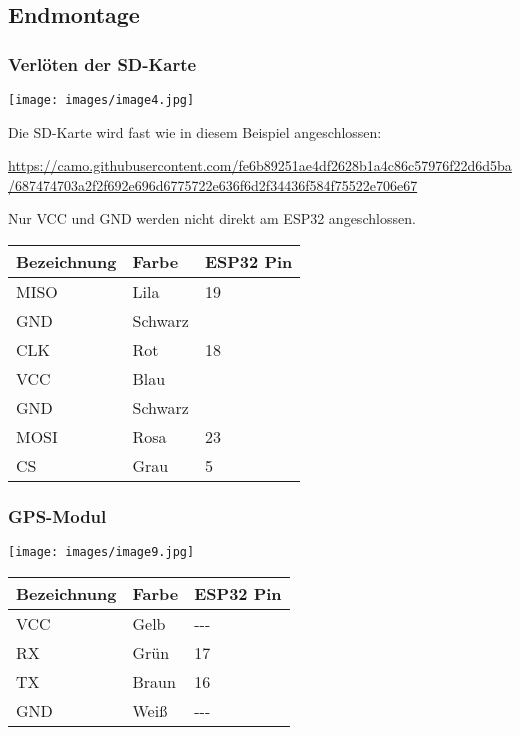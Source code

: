 \documentclass{scrartcl}
\begin{document}
\subsection*{Endmontage}

\subsubsection{Verlöten der SD-Karte}


\begin{center}
	\texttt{[image: images/image4.jpg]}
\end{center}

{Die SD-Karte wird fast wie in diesem Beispiel angeschlossen:}

{\href{https://www.google.com/url?q=https://camo.githubusercontent.com/fe6b89251ae4df2628b1a4c86c57976f22d6d5ba/687474703a2f2f692e696d6775722e636f6d2f34436f584f75522e706e67\&sa=D\&ust=1588976963798000}{https://camo.githubusercontent.com/fe6b89251ae4df2628b1a4c86c57976f22d6d5ba/687474703a2f2f692e696d6775722e636f6d2f34436f584f75522e706e67}}


Nur VCC und GND werden nicht direkt am ESP32 angeschlossen.


\begin{center}
	\begin{tabular}{@{}lll@{}}
		\toprule
		{Bezeichnung} & {Farbe} & {ESP32 Pin}\\
		\midrule
		{MISO} & {Lila} & {19}\\
		{GND} & {Schwarz} & {}\\
		{CLK} & {Rot} & {18}\\
		{VCC} & {Blau} & {}\\
		{GND} & {Schwarz} & {}\\
		{MOSI} & {Rosa} & {23}\\
		{CS} & {Grau} & {5}\\
		\bottomrule
	\end{tabular}
\end{center}


\subsubsection{GPS-Modul}

\begin{center}
	\texttt{[image: images/image9.jpg]}
\end{center}


\begin{center}
	\begin{tabular}{@{}lll@{}}
		\toprule
		{Bezeichnung} & {Farbe} & {ESP32 Pin}\\
		\midrule
		{VCC} & {Gelb} & {-\/-\/-}\\
		{RX} & {Grün} & {17}\\
		{TX} & {Braun} & {16}\\
		{GND} & {Weiß} & {-\/-\/-}\\
		\bottomrule
	\end{tabular}
\end{center}
\end{document}
